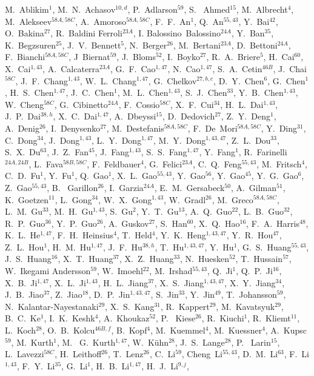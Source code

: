 \begin{small}
\begin{center}
M.~Ablikim$^{1}$, M.~N.~Achasov$^{10,d}$, P.~Adlarson$^{59}$, S. ~Ahmed$^{15}$, M.~Albrecht$^{4}$, M.~Alekseev$^{58A,58C}$, A.~Amoroso$^{58A,58C}$, F.~F.~An$^{1}$, Q.~An$^{55,43}$, Y.~Bai$^{42}$, O.~Bakina$^{27}$, R.~Baldini Ferroli$^{23A}$, I. Balossino~Balossino$^{24A}$, Y.~Ban$^{35}$, K.~Begzsuren$^{25}$, J.~V.~Bennett$^{5}$, N.~Berger$^{26}$, M.~Bertani$^{23A}$, D.~Bettoni$^{24A}$, F.~Bianchi$^{58A,58C}$, J~Biernat$^{59}$, J.~Bloms$^{52}$, I.~Boyko$^{27}$, R.~A.~Briere$^{5}$, H.~Cai$^{60}$, X.~Cai$^{1,43}$, A.~Calcaterra$^{23A}$, G.~F.~Cao$^{1,47}$, N.~Cao$^{1,47}$, S.~A.~Cetin$^{46B}$, J.~Chai$^{58C}$, J.~F.~Chang$^{1,43}$, W.~L.~Chang$^{1,47}$, G.~Chelkov$^{27,b,c}$, D.~Y.~Chen$^{6}$, G.~Chen$^{1}$, H.~S.~Chen$^{1,47}$, J.~C.~Chen$^{1}$, M.~L.~Chen$^{1,43}$, S.~J.~Chen$^{33}$, Y.~B.~Chen$^{1,43}$, W.~Cheng$^{58C}$, G.~Cibinetto$^{24A}$, F.~Cossio$^{58C}$, X.~F.~Cui$^{34}$, H.~L.~Dai$^{1,43}$, J.~P.~Dai$^{38,h}$, X.~C.~Dai$^{1,47}$, A.~Dbeyssi$^{15}$, D.~Dedovich$^{27}$, Z.~Y.~Deng$^{1}$, A.~Denig$^{26}$, I.~Denysenko$^{27}$, M.~Destefanis$^{58A,58C}$, F.~De~Mori$^{58A,58C}$, Y.~Ding$^{31}$, C.~Dong$^{34}$, J.~Dong$^{1,43}$, L.~Y.~Dong$^{1,47}$, M.~Y.~Dong$^{1,43,47}$, Z.~L.~Dou$^{33}$, S.~X.~Du$^{63}$, J.~Z.~Fan$^{45}$, J.~Fang$^{1,43}$, S.~S.~Fang$^{1,47}$, Y.~Fang$^{1}$, R.~Farinelli$^{24A,24B}$, L.~Fava$^{58B,58C}$, F.~Feldbauer$^{4}$, G.~Felici$^{23A}$, C.~Q.~Feng$^{55,43}$, M.~Fritsch$^{4}$, C.~D.~Fu$^{1}$, Y.~Fu$^{1}$, Q.~Gao$^{1}$, X.~L.~Gao$^{55,43}$, Y.~Gao$^{56}$, Y.~Gao$^{45}$, Y.~G.~Gao$^{6}$, Z.~Gao$^{55,43}$, B. ~Garillon$^{26}$, I.~Garzia$^{24A}$, E.~M.~Gersabeck$^{50}$, A.~Gilman$^{51}$, K.~Goetzen$^{11}$, L.~Gong$^{34}$, W.~X.~Gong$^{1,43}$, W.~Gradl$^{26}$, M.~Greco$^{58A,58C}$, L.~M.~Gu$^{33}$, M.~H.~Gu$^{1,43}$, S.~Gu$^{2}$, Y.~T.~Gu$^{13}$, A.~Q.~Guo$^{22}$, L.~B.~Guo$^{32}$, R.~P.~Guo$^{36}$, Y.~P.~Guo$^{26}$, A.~Guskov$^{27}$, S.~Han$^{60}$, X.~Q.~Hao$^{16}$, F.~A.~Harris$^{48}$, K.~L.~He$^{1,47}$, F.~H.~Heinsius$^{4}$, T.~Held$^{4}$, Y.~K.~Heng$^{1,43,47}$, Y.~R.~Hou$^{47}$, Z.~L.~Hou$^{1}$, H.~M.~Hu$^{1,47}$, J.~F.~Hu$^{38,h}$, T.~Hu$^{1,43,47}$, Y.~Hu$^{1}$, G.~S.~Huang$^{55,43}$, J.~S.~Huang$^{16}$, X.~T.~Huang$^{37}$, X.~Z.~Huang$^{33}$, N.~Huesken$^{52}$, T.~Hussain$^{57}$, W.~Ikegami Andersson$^{59}$, W.~Imoehl$^{22}$, M.~Irshad$^{55,43}$, Q.~Ji$^{1}$, Q.~P.~Ji$^{16}$, X.~B.~Ji$^{1,47}$, X.~L.~Ji$^{1,43}$, H.~L.~Jiang$^{37}$, X.~S.~Jiang$^{1,43,47}$, X.~Y.~Jiang$^{34}$, J.~B.~Jiao$^{37}$, Z.~Jiao$^{18}$, D.~P.~Jin$^{1,43,47}$, S.~Jin$^{33}$, Y.~Jin$^{49}$, T.~Johansson$^{59}$, N.~Kalantar-Nayestanaki$^{29}$, X.~S.~Kang$^{31}$, R.~Kappert$^{29}$, M.~Kavatsyuk$^{29}$, B.~C.~Ke$^{1}$, I.~K.~Keshk$^{4}$, A.~Khoukaz$^{52}$, P. ~Kiese$^{26}$, R.~Kiuchi$^{1}$, R.~Kliemt$^{11}$, L.~Koch$^{28}$, O.~B.~Kolcu$^{46B,f}$, B.~Kopf$^{4}$, M.~Kuemmel$^{4}$, M.~Kuessner$^{4}$, A.~Kupsc$^{59}$, M.~Kurth$^{1}$, M.~ G.~Kurth$^{1,47}$, W.~K\"uhn$^{28}$, J.~S.~Lange$^{28}$, P. ~Larin$^{15}$, L.~Lavezzi$^{58C}$, H.~Leithoff$^{26}$, T.~Lenz$^{26}$, C.~Li$^{59}$, Cheng~Li$^{55,43}$, D.~M.~Li$^{63}$, F.~Li$^{1,43}$, F.~Y.~Li$^{35}$, G.~Li$^{1}$, H.~B.~Li$^{1,47}$, H.~J.~Li$^{9,j}$, 
\end{center}
\end{small}

